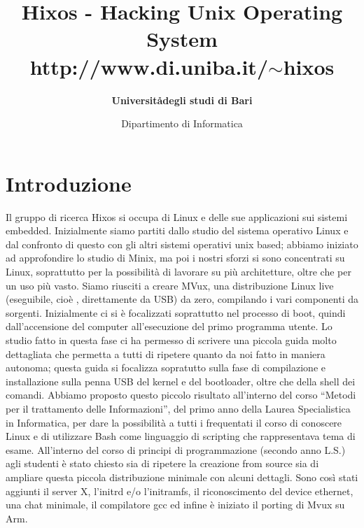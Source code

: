 \documentclass[a4paper,12pt]{article}
\title{\textbf{Hixos} - Hacking Unix Operating System\\http://www.di.uniba.it/$\sim$hixos}
\author{\textbf{Universit\aa degli studi di Bari}}
\date{Dipartimento di Informatica}
\newcommand{\ua }{\`{u} }
\renewcommand{\aa }{\`{a} }
\newcommand{\ea }{\`{e} }
\newcommand{\ia }{\`{i} }
\begin{document}
\maketitle

\section*{Introduzione}
Il gruppo di ricerca Hixos si occupa di Linux e delle sue applicazioni sui sistemi embedded.
Inizialmente siamo partiti dallo studio del sistema operativo Linux e dal confronto di questo con gli altri sistemi operativi unix based; abbiamo iniziato ad approfondire lo studio di Minix, ma poi i nostri sforzi si sono concentrati su Linux, soprattutto per la possibilità di lavorare su pi\ua architetture, oltre che per un uso pi\ua vasto.
Siamo riusciti a creare MVux, una distribuzione Linux live (eseguibile, cio\ea, direttamente da USB) da zero, compilando i vari componenti da sorgenti.
Inizialmente ci si \ea focalizzati soprattutto nel processo di boot, quindi dall'accensione del computer all'esecuzione del primo programma utente.
Lo studio fatto in questa fase ci ha permesso di scrivere una piccola guida molto dettagliata che permetta a tutti di ripetere quanto da noi fatto in maniera autonoma; questa guida si focalizza sopratutto sulla fase di compilazione e installazione sulla penna USB del kernel e del bootloader, oltre che della shell dei comandi.
Abbiamo proposto questo piccolo risultato all'interno del corso ``Metodi per il trattamento delle Informazioni'', del primo anno della Laurea Specialistica in Informatica, per dare la possibilit\aa a tutti i frequentati il corso di conoscere Linux e di utilizzare Bash come linguaggio di scripting che rappresentava tema di esame.
All'interno del corso di principi di programmazione (secondo anno L.S.) agli studenti \ea stato chiesto sia di ripetere la creazione from source sia di ampliare questa piccola distribuzione minimale con alcuni dettagli. Sono cos\ia stati aggiunti il server X, l'initrd e\slash o l'initramfs, il riconoscimento del device ethernet, una chat minimale, il compilatore gcc ed infine \ea iniziato il porting di Mvux su Arm.
\end{document}
